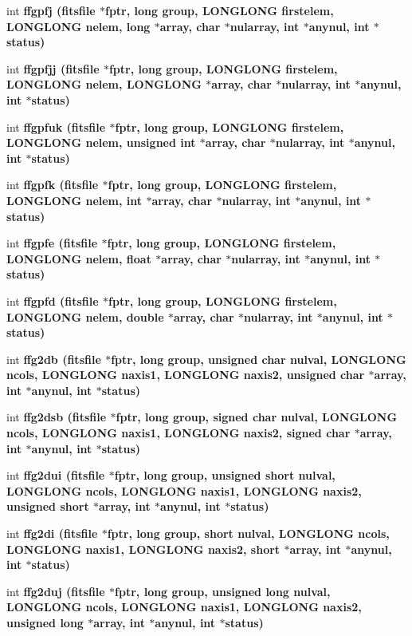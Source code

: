 \begin{CompactItemize}
\item 
int \bf{ffgpfj} (\bf{fitsfile} $\ast$fptr, long group, \bf{LONGLONG} firstelem, \bf{LONGLONG} nelem, long $\ast$array, char $\ast$nularray, int $\ast$anynul, int $\ast$status)
\item 
int \bf{ffgpfjj} (\bf{fitsfile} $\ast$fptr, long group, \bf{LONGLONG} firstelem, \bf{LONGLONG} nelem, \bf{LONGLONG} $\ast$array, char $\ast$nularray, int $\ast$anynul, int $\ast$status)
\item 
int \bf{ffgpfuk} (\bf{fitsfile} $\ast$fptr, long group, \bf{LONGLONG} firstelem, \bf{LONGLONG} nelem, unsigned int $\ast$array, char $\ast$nularray, int $\ast$anynul, int $\ast$status)
\item 
int \bf{ffgpfk} (\bf{fitsfile} $\ast$fptr, long group, \bf{LONGLONG} firstelem, \bf{LONGLONG} nelem, int $\ast$array, char $\ast$nularray, int $\ast$anynul, int $\ast$status)
\item 
int \bf{ffgpfe} (\bf{fitsfile} $\ast$fptr, long group, \bf{LONGLONG} firstelem, \bf{LONGLONG} nelem, float $\ast$array, char $\ast$nularray, int $\ast$anynul, int $\ast$status)
\item 
int \bf{ffgpfd} (\bf{fitsfile} $\ast$fptr, long group, \bf{LONGLONG} firstelem, \bf{LONGLONG} nelem, double $\ast$array, char $\ast$nularray, int $\ast$anynul, int $\ast$status)
\item 
int \bf{ffg2db} (\bf{fitsfile} $\ast$fptr, long group, unsigned char nulval, \bf{LONGLONG} ncols, \bf{LONGLONG} naxis1, \bf{LONGLONG} naxis2, unsigned char $\ast$array, int $\ast$anynul, int $\ast$status)
\item 
int \bf{ffg2dsb} (\bf{fitsfile} $\ast$fptr, long group, signed char nulval, \bf{LONGLONG} ncols, \bf{LONGLONG} naxis1, \bf{LONGLONG} naxis2, signed char $\ast$array, int $\ast$anynul, int $\ast$status)
\item 
int \bf{ffg2dui} (\bf{fitsfile} $\ast$fptr, long group, unsigned short nulval, \bf{LONGLONG} ncols, \bf{LONGLONG} naxis1, \bf{LONGLONG} naxis2, unsigned short $\ast$array, int $\ast$anynul, int $\ast$status)
\item 
int \bf{ffg2di} (\bf{fitsfile} $\ast$fptr, long group, short nulval, \bf{LONGLONG} ncols, \bf{LONGLONG} naxis1, \bf{LONGLONG} naxis2, short $\ast$array, int $\ast$anynul, int $\ast$status)
\item 
int \bf{ffg2duj} (\bf{fitsfile} $\ast$fptr, long group, unsigned long nulval, \bf{LONGLONG} ncols, \bf{LONGLONG} naxis1, \bf{LONGLONG} naxis2, unsigned long $\ast$array, int $\ast$anynul, int $\ast$status)

\end{CompactItemize}
